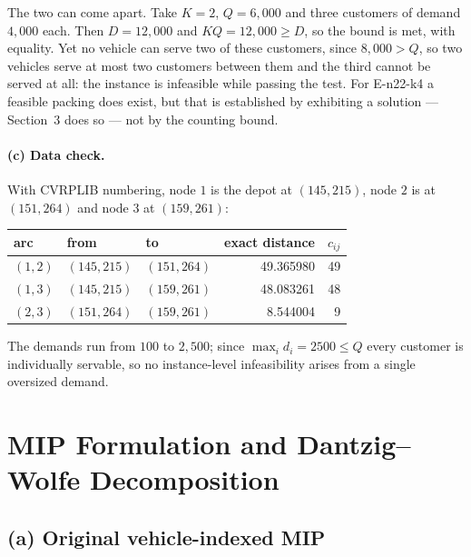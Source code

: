 \documentclass[11pt]{article}
\begin{document}
The two can come apart. Take $K = 2$, $Q = 6{,}000$ and three
customers of demand $4{,}000$ each. Then $D = 12{,}000$ and
$KQ = 12{,}000 \ge D$, so the bound is met, with equality. Yet no
vehicle can serve two of these customers, since $8{,}000 > Q$, so two
vehicles serve at most two customers between them and the third cannot
be served at all: the instance is infeasible while passing the test.
For E-n22-k4 a feasible packing does exist, but that is established by
exhibiting a solution --- Section~3 does so --- not by the counting
bound.

\paragraph{(c) Data check.}
With CVRPLIB numbering, node $1$ is the depot at $(145,215)$, node $2$
is at $(151,264)$ and node $3$ at $(159,261)$:

\begin{center}
\begin{tabular}{@{}lllrr@{}}
\toprule
arc & from & to & exact distance & $c_{ij}$\\
\midrule
$(1,2)$ & $(145,215)$ & $(151,264)$ & 49.365980 & 49\\
$(1,3)$ & $(145,215)$ & $(159,261)$ & 48.083261 & 48\\
$(2,3)$ & $(151,264)$ & $(159,261)$ &  8.544004 &  9\\
\bottomrule
\end{tabular}
\end{center}

The demands run from $100$ to $2{,}500$; since $\max_i d_i = 2500 \le Q$
every customer is individually servable, so no instance-level
infeasibility arises from a single oversized demand.

\section{MIP Formulation and Dantzig--Wolfe Decomposition}

\subsection{(a) Original vehicle-indexed MIP}
\end{document}
